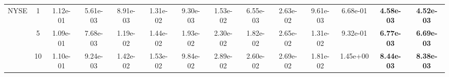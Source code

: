 \begin{table}[!t]
{\begin{tabular}{cccccccccccccc}
\multirow{3}{*}{NYSE}& 1& 1.12e-01& 5.61e-03 & 8.91e-03 & 1.31e-02 & 9.30e-03& 1.53e-02& 6.55e-03 & 2.63e-02 & 9.61e-03& 6.68e-01 & \bf{4.58e-03} & \bf{4.52e-03}\s \\\cmidrule(l){3-14}
 & 5& 1.09e-01& 7.68e-03 & 1.19e-02 & 1.44e-02 & 1.93e-02& 2.30e-02& 1.82e-02 & 2.65e-02 & 1.31e-02& 9.32e-01 & \bf{6.77e-03} & \bf{6.69e-03}\s \\\cmidrule(l){3-14}
 & 10 & 1.10e-01& 9.24e-03 & 1.42e-02 & 1.53e-02 & 9.84e-02& 2.89e-02& 2.60e-02 & 2.69e-02 & 1.81e-02& 1.45e+00 & \bf{8.44e-03} & \bf{8.38e-03}\s \\ \bottomrule
\end{tabular}}
\end{table}